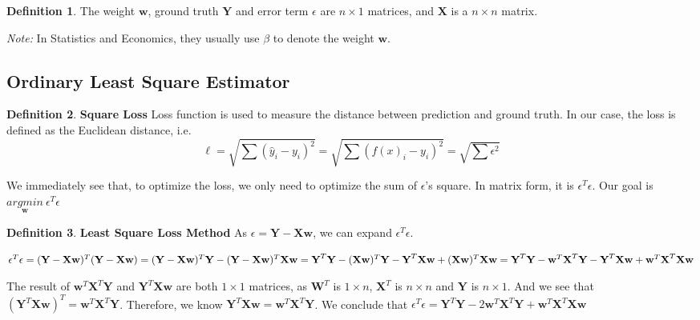 \documentclass{article}
\theoremstyle{definition}
\newtheorem{defi}{Definition}[subsection]
\begin{document}
\begin{defi}
The weight $\textbf{w}$, ground truth $\textbf{Y}$ and error term $\epsilon$ are $n\times 1$ matrices, and $\textbf{X}$ is  a $n\times n$ matrix.

\textit{Note:} In Statistics and Economics, they usually use $\beta$ to denote the weight $\textbf{w}$.
\end{defi}

\subsection{Ordinary Least Square Estimator}
\begin{defi}
\textbf{Square Loss} Loss function is used to measure the distance between prediction and ground truth. In our case, the loss is defined as the Euclidean distance, i.e. $$\ell=\sqrt{\sum{(\hat{y}_i-y_i)^{2}}}=\sqrt{\sum{(f(x)_i-y_i)^{2}}}=\sqrt{\sum{\epsilon^{2}}}$$

We immediately see that, to optimize the loss, we only need to optimize the sum of $\epsilon$'s square. In matrix form, it is $\epsilon^{T}\epsilon$. Our goal is $\underset{\textbf{w}}{argmin}\ \epsilon^{T}\epsilon$
\end{defi}

\begin{defi}
\textbf{Least Square Loss Method} As $\epsilon=\textbf{Y}-\textbf{X}\textbf{w}$, we can expand $\epsilon^{T}\epsilon$.

$\epsilon^{T}\epsilon=(\textbf{Y}-\textbf{X}\textbf{w})^{T}(\textbf{Y}-\textbf{X}\textbf{w}) \\
=(\textbf{Y}-\textbf{X}\textbf{w})^{T}\textbf{Y}-(\textbf{Y}-\textbf{X}\textbf{w})^{T}\textbf{X}\textbf{w} \\
=\textbf{Y}^{T}\textbf{Y}-(\textbf{X}\textbf{w})^{T}\textbf{Y}-\textbf{Y}^{T}\textbf{X}\textbf{w}+(\textbf{X}\textbf{w})^{T}\textbf{X}\textbf{w} \\
=\textbf{Y}^{T}\textbf{Y}-\textbf{w}^{T}\textbf{X}^{T}\textbf{Y}-\textbf{Y}^{T}\textbf{X}\textbf{w}+\textbf{w}^{T}\textbf{X}^{T}\textbf{X}\textbf{w}
$

The result of $\textbf{w}^{T}\textbf{X}^{T}\textbf{Y}$ and $\textbf{Y}^{T}\textbf{X}\textbf{w}$ are both $1\times 1$ matrices, as $\textbf{W}^{T}$ is $1\times n$, $\textbf{X}^{T}$ is $n\times n$ and $\textbf{Y}$ is $n\times 1$. And we see that $(\textbf{Y}^{T}\textbf{X}\textbf{w})^{T}=\textbf{w}^{T}\textbf{X}^{T}\textbf{Y}$. Therefore, we know $\textbf{Y}^{T}\textbf{X}\textbf{w}=\textbf{w}^{T}\textbf{X}^{T}\textbf{Y}$. We conclude that $\epsilon^{T}\epsilon=\textbf{Y}^{T}\textbf{Y}-2\textbf{w}^{T}\textbf{X}^{T}\textbf{Y}+\textbf{w}^{T}\textbf{X}^{T}\textbf{X}\textbf{w}$

\end{defi}
\end{document}
